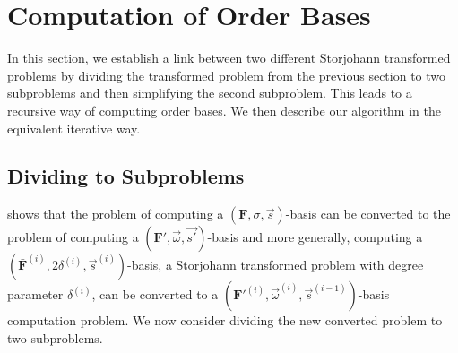 
\section{Computation of Order Bases}

\label{sec:Order-Basis-Computation}

In this section, we establish a link between two different Storjohann
transformed problems by dividing the transformed problem from the
previous section to two subproblems and then simplifying the second
subproblem. This leads to a recursive way of computing order bases.
We then describe our algorithm in the equivalent iterative way.


\subsection{\label{sub:Dividing-to-Subproblems}Dividing to Subproblems }

 shows that the problem of computing a $\left(\mathbf{F},\sigma,\vec{s}\right)$-basis
can be converted to the problem of computing a $(\mathbf{F}',\vec{\omega},\vec{s'})$-basis
and more generally, computing a $(\bar{\mathbf{F}}^{\left(i\right)},2\delta^{\left(i\right)},\vec{s}^{\left(i\right)})$-basis,
a Storjohann transformed problem with degree parameter $\delta^{\left(i\right)}$,
can be converted to a $(\mathbf{F}'^{\left(i\right)},\vec{\omega}^{\left(i\right)},\vec{s}^{\left(i-1\right)})$-basis
computation problem. We now consider dividing the new converted problem
to two subproblems.

